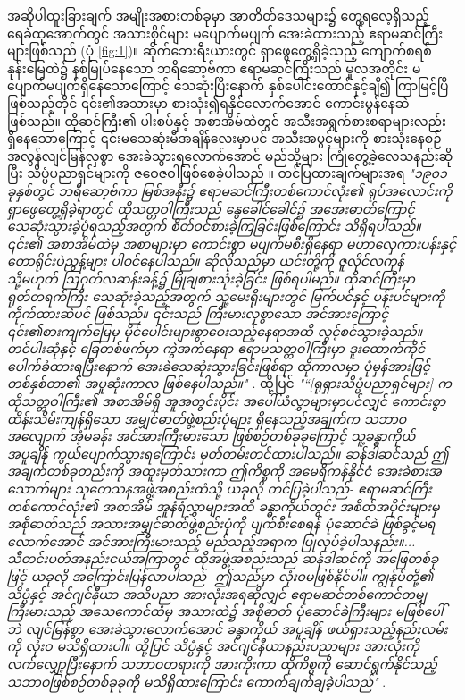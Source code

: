\documentclass[10pt,twocolumn,letterpaper]{article}
\begin{document}
အဆိုပါထူးခြားချက် အမျိုးအစားတစ်ခုမှာ အာတိတ်ဒေသများ၌ တွေ့ရလေ့ရှိသည့် ရေခဲထုအောက်တွင် အသားစိုင်များ မပျောက်မပျက် အေးခဲထားသည့် ဧရာမဆင်ကြီးများဖြစ်သည် (ပုံ \ref{fig:1})။ ဆိုက်‌ဘေးရီးယားတွင် ရှာဖွေတွေ့ရှိခဲ့သည့် ကျောက်စရစ်နုန်းမြေထဲ၌ နစ်မြုပ်နေသော ဘရီဆော့ဗ်ကာ ဧရာမဆင်ကြီးသည် မူလအတိုင်း မပျောက်မပျက်ရှိနေသောကြောင့် သေဆုံးပြီးနောက် နှစ်ပေါင်းထောင်နှင့်ချီ၍ ကြာမြင့်ပြီဖြစ်သည့်တိုင် ၎င်း၏အသားမှာ စားသုံး၍ရနိုင်လောက်အောင် ကောင်းမွန်နေဆဲဖြစ်သည်။ ထိုဆင်ကြီး၏ ပါးစပ်နှင့် အစာအိမ်ထဲတွင် အသီးအရွက်စားစရာများလည်း ရှိနေသောကြောင့် ၎င်းမသေဆုံးမီအချိန်လေးမှာပင် အသီးအပွင့်များကို စားသုံးနေစဉ် အလွန်လျင်မြန်လှစွာ အေးခဲသွားရလောက်အောင် မည်သို့များ ကြုံတွေ့ခဲ့လေသနည်းဆိုပြီး သိပ္ပံပညာရှင်များကို ဇဝေဇဝါဖြစ်စေခဲ့ပါသည် \cite{17}။ တင်ပြထားချက်များအရ \textit{"၁၉၀၁ ခုနှစ်တွင် ဘရီဆော့ဗ်ကာ မြစ်အနီး၌ ဧရာမဆင်ကြီးတစ်ကောင်လုံး၏ ရုပ်အလောင်းကို ရှာဖွေတွေ့ရှိခဲ့ရာတွင် ထိုသတ္တဝါကြီးသည် နွေခေါင်ခေါင်၌ အအေးဓာတ်ကြောင့် သေဆုံးသွားခဲ့ပုံရသည့်အတွက် စိတ်ဝင်စားခဲ့ကြခြင်းဖြစ်ကြောင်း သိရှိရပါသည်။  ၎င်း၏ အစာအိမ်ထဲမှ အစာများမှာ ကောင်းစွာ မပျက်မစီးရှိနေရာ မဟာလှေကားပန်းနှင့် တောရိုင်းပဲညွန့်များ ပါဝင်နေပါသည်။ ဆိုလိုသည်မှာ ယင်းတို့ကို ဇူလိုင်လကုန် သို့မဟုတ် ဩဂုတ်လဆန်းခန့်၌ မြိုချစားသုံးခဲ့ခြင်း ဖြစ်ရပါမည်။ ထိုဆင်ကြီးမှာ ရုတ်တရက်ကြီး သေဆုံးခဲ့သည့်အတွက် သူ့မေးရိုးများတွင် မြက်ပင်နှင့် ပန်းပင်များကို ကိုက်ထားဆဲပင် ဖြစ်သည်။ ၎င်းသည် ကြီးမားလှစွာသော အင်အားကြောင့် ၎င်း၏စားကျက်မြေမှ မိုင်ပေါင်းများစွာဝေးသည့်နေရာအထိ လွင့်စင်သွားခဲ့သည်။ တင်ပါးဆုံနှင့် ခြေတစ်ဖက်မှာ ကွဲအက်နေရာ ဧရာမသတ္တဝါကြီးမှာ ဒူးထောက်ကိုင်ပေါက်ခံထားရပြီးနောက် အေးခဲသေဆုံးသွားခြင်းဖြစ်ရာ ထိုကာလမှာ ပုံမှန်အားဖြင့် တစ်နှစ်တာ၏ အပူဆုံးကာလ ဖြစ်နေပါသည်။"} \cite{18}. ထို့ပြင် \textit{"“[ရုရှားသိပ္ပံပညာရှင်များ] က ထိုသတ္တဝါကြီး၏ အစာအိမ်ရှိ အူအတွင်းပိုင်း အပေါ်ယံလွှာများမှာပင်လျှင် ကောင်းစွာ ထိန်းသိမ်းကျန်ရှိသော အမျှင်ဓာတ်ဖွဲ့စည်းပုံများ ရှိနေသည့်အချက်က သဘာဝအလျောက် အံ့မခန်း အင်အားကြီးမားသော ဖြစ်စဉ်တစ်ခုခုကြောင့် သူ့ခန္ဓာကိုယ် အပူချိန် ကွယ်ပျောက်သွားရကြောင်း မှတ်တမ်းတင်ထားပါသည်။ ဆန်ဒါဆင်သည် ဤအချက်တစ်ခုတည်းကို အထူးမှတ်သားကာ ဤကိစ္စကို အမေရိကန်နိုင်ငံ အေးခဲစားအသောက်များ သုတေသနအဖွဲ့အစည်းထံသို့ ယခုလို တင်ပြခဲ့ပါသည်- ဧရာမဆင်ကြီး တစ်ကောင်လုံး၏ အစာအိမ် အူနံရံလွှာများအထိ ခန္ဓာကိုယ်တွင်း အစိတ်အပိုင်းများမှ အစိုဓာတ်သည် အသားအမျှင်ဓာတ်ဖွဲ့စည်းပုံကို ပျက်စီးစေရန် ပုံဆောင်ခဲ ဖြစ်ခွင့်မရလောက်အောင် အင်အားကြီးမားသည့် မည်သည့်အရာက ပြုလုပ်ခဲ့ပါသနည်း။... သီတင်းပတ်အနည်းငယ်အကြာတွင် ထိုအဖွဲ့အစည်းသည် ဆန်ဒါဆင်ကို အဖြေတစ်ခုဖြင့် ယခုလို အကြောင်းပြန်လာပါသည်- ဤသည်မှာ လုံးဝမဖြစ်နိုင်ပါ။ ကျွန်ုပ်တို့၏ သိပ္ပံနှင့် အင်ဂျင်နီယာ အသိပညာ အားလုံးအရဆိုလျှင် ဧရာမဆင်တစ်ကောင်တမျှ ကြီးမားသည့် အသေကောင်ထံမှ အသားထဲ၌ အစိုဓာတ် ပုံဆောင်ခဲကြီးများ မဖြစ်ပေါ်ဘဲ လျင်မြန်စွာ အေးခဲသွားလောက်အောင် ခန္ဓာကိုယ် အပူချိန် ဖယ်ရှားသည့်နည်းလမ်းကို လုံးဝ မသိရှိထားပါ။ ထို့ပြင် သိပ္ပံနှင့် အင်ဂျင်နီယာနည်းပညာများ အားလုံးကို လက်လျှော့ပြီးနောက် သဘာဝတရားကို အားကိုးကာ ထိုကိစ္စကို ဆောင်ရွက်နိုင်သည့် သဘာဝဖြစ်စဉ်တစ်ခုခုကို မသိရှိထားကြောင်း ကောက်ချက်ချခဲ့ပါသည်"} \cite{19}.
\end{document}
